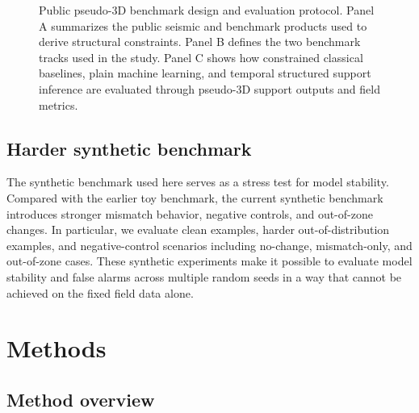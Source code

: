 \documentclass[preprint,12pt]{elsarticle}
\begin{document}
\begin{figure}[H]
{
}
\caption{Public pseudo-3D benchmark design and evaluation protocol. Panel A summarizes the public seismic and benchmark products used to derive structural constraints. Panel B defines the two benchmark tracks used in the study. Panel C shows how constrained classical baselines, plain machine learning, and temporal structured support inference are evaluated through pseudo-3D support outputs and field metrics.}
\label{fig:benchmarkdesign}
\end{figure}

\subsection{Harder synthetic benchmark}

The synthetic benchmark used here serves as a stress test for model stability. Compared with the earlier toy benchmark, the current synthetic benchmark introduces stronger mismatch behavior, negative controls, and out-of-zone changes. In particular, we evaluate clean examples, harder out-of-distribution examples, and negative-control scenarios including no-change, mismatch-only, and out-of-zone cases. These synthetic experiments make it possible to evaluate model stability and false alarms across multiple random seeds in a way that cannot be achieved on the fixed field data alone.

\section{Methods}

\subsection{Method overview}
\end{document}
